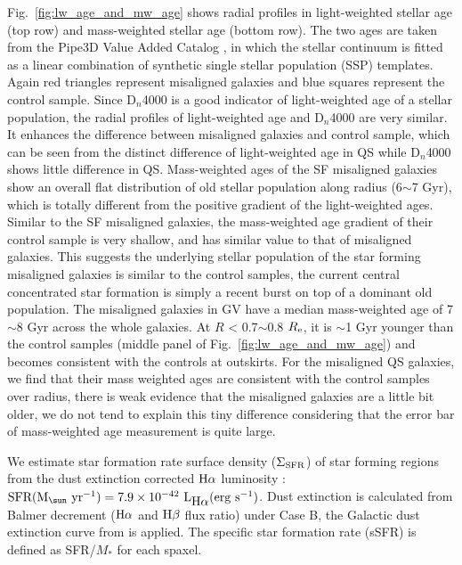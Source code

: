 Fig.~\ref{fig:lw_age_and_mw_age} shows radial profiles in light-weighted stellar age (top row) and mass-weighted stellar age (bottom row). The two ages are taken from the Pipe3D Value Added Catalog \citep{2016RMxAA..52...21S, 2016RMxAA..52..171S}, in which the stellar continuum is fitted as a linear combination of synthetic single stellar population (SSP) templates. Again red triangles represent misaligned galaxies and blue squares represent the control sample. Since D$_n$4000 is a good indicator of light-weighted age of a stellar population, the radial profiles of light-weighted age and D$_n$4000 are very similar. It enhances the difference between misaligned galaxies and control sample, which can be seen from the distinct difference of light-weighted age in QS while D$_n$4000 shows little difference in QS. Mass-weighted ages of the SF misaligned galaxies show an overall flat distribution of old stellar population along radius (6$\sim$7 Gyr), which is totally different from the positive gradient of the light-weighted ages. Similar to the SF misaligned galaxies, the mass-weighted age gradient of their control sample is very shallow, and has similar value to that of misaligned galaxies. This suggests the underlying stellar population of the star forming misaligned galaxies is similar to the control samples, the current central concentrated star formation is simply a recent burst on top of a dominant old population. The misaligned galaxies in GV have a median mass-weighted age of 7$\sim$8 Gyr across the whole galaxies. At $R$ < 0.7$\sim$0.8 $R_{\rm e}$, it is $\sim$1 Gyr younger than the control samples (middle panel of Fig.~\ref{fig:lw_age_and_mw_age}) and becomes consistent with the controls at outskirts. For the misaligned QS galaxies, we find that their mass weighted ages are consistent with the control samples over radius, there is weak evidence that the misaligned galaxies are a little bit older, we do not tend to explain this tiny difference considering that the error bar of mass-weighted age measurement is quite large.

We estimate star formation rate surface density ($\Sigma_{\rm SFR}$) of star forming regions from the dust extinction corrected $\hbox{H$\alpha$}$ luminosity \citep{salpeter_luminosity_1955, kennicutt_star_1998} : $\rm SFR(M_{\sun} \ yr^{-1}) = 7.9 \times 10^{-42} \ L_{\ha} (erg \ s^{-1})$. Dust extinction is calculated from Balmer decrement ($\hbox{H$\alpha$}$ and $\hbox{H$\beta$}$ flux ratio) under Case B, the Galactic dust extinction curve from \citet{calzetti_dust_2001} is applied. 
The specific star formation rate (sSFR) is defined as SFR/$M_*$ for each spaxel.


